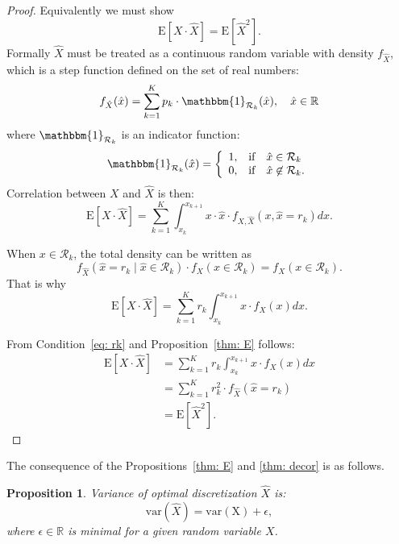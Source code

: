 \documentclass[10pt]{article}
\newtheorem{prop}{Proposition}
\begin{document}
\begin{proof}
Equivalently we must show
$$
\mathrm{E}[X \cdot \hat{X}] = \mathrm{E}[\hat{X}^{2}].
$$
Formally $\hat{X}$ must be treated as a continuous random variable with density $f_{\hat{X}}$, which is a step function defined on the set of real numbers:
\begin{equation}
f_{\hat{X}}(\hat{x}) = \sum_{k = 1}^{K} p_{k} \cdot \mathbbm{1}_{\mathcal{R}_{k}}(\hat{x}), \quad \hat{x} \in \mathbb{R}
\end{equation}
where $\mathbbm{1}_{\mathcal{R}_{k}}$ is an indicator function:
\[ \mathbbm{1}_{\mathcal{R}_{k}}(\hat{x}) =  \left\{
\begin{array}{ll}
      1, & \text{if} \quad \hat{x} \in  \mathcal{R}_{k}\\
      0, & \text{if} \quad \hat{x} \not\in  \mathcal{R}_{k}.\\      
\end{array}
\right. \]
Correlation between $X$ and $\hat{X}$ is then:
$$
\mathrm{E}[X \cdot \hat{X}] = \sum_{k=1}^{K} \int_{x_{k}}^{x_{k+1}} 
x \cdot \hat{x} \cdot
f_{X, \hat{X}} (x, \hat{x} = r_{k}) dx.
$$

When $x \in \mathcal{R}_{k}$, the total density can be written as
$$
f_{\hat{X}}(\hat{x} = r_{k} \mid \hat{x} \in \mathcal{R}_{k} ) \cdot
f_{X}( x \in \mathcal{R}_{k} ) = f_{X}(x \in \mathcal{R}_{k}).
$$
That is why
$$
\mathrm{E}[X \cdot \hat{X}] = \sum_{k=1}^{K} r_{k} \int_{x_{k}}^{x_{k+1}} 
x \cdot f_{X} (x) dx.
$$

From Condition~\ref{eq: rk} and Proposition~\ref{thm: E} follows:
\begin{align*}
\mathrm{E}[X \cdot \hat{X}] &= \sum_{k=1}^{K} r_{k} \int_{x_{k}}^{x_{k+1}} 
x \cdot f_{X} (x) dx \\ 
&= \sum_{k=1}^{K} r_{k}^{2} \cdot f_{\hat{X}} (\hat{x} = r_{k}) \\
&= \mathrm{E}[\hat{X}^{2}].
\end{align*}
\end{proof}

The consequence of the Propositions~\ref{thm: E} and \ref{thm: decor} is as follows. 
\begin{prop} \label{thm: var_diff}
Variance of optimal discretization $\hat{X}$ is:
\begin{equation}
\mathrm{var}(\hat{X}) = \mathrm{var(X)} + \epsilon,
\end{equation}
where $\epsilon \in \mathbb{R}$ is minimal for a given random variable $X$.
\end{prop}
\end{document}
